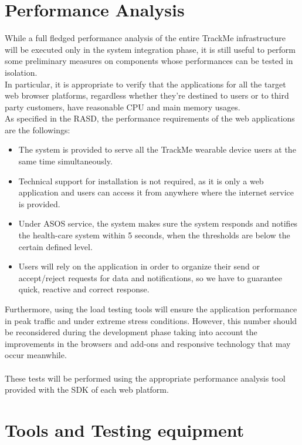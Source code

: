 \documentclass[a4paper, hidelinks, 12pt]{report}
\begin{document}
	
	\chapter{Performance Analysis}
	While a full fledged performance analysis of the entire TrackMe infrastructure will be executed only in the system integration phase, it is still useful to perform some preliminary measures on components whose performances can be tested in isolation.\\
	
	In particular, it is appropriate to verify that the applications for all the target web browser platforms, regardless whether they're destined to users or to third party customers, have reasonable CPU and main memory usages.\\
	
	As specified in the RASD, the performance requirements of the web applications are the followings:
	\begin{itemize}
	\item{} The system is provided to serve all the TrackMe wearable device users at the same time simultaneously.
	\item{} Technical support for installation is not required, as it is only a web application and users can access it from anywhere where the internet service is provided.
	\item{} Under ASOS service, the system makes sure the system responds and notifies the health-care system within 5 seconds, when the thresholds are below the certain defined level.
	\item{} Users will rely on the application in order to organize their send or accept/reject requests for data and notifications, so we have to guarantee quick, reactive and correct response.
	\end{itemize}
	Furthermore, using the load testing tools will ensure the application performance in peak traffic and under extreme stress conditions.
	However, this number should be reconsidered during the development phase taking into account the improvements
in the browsers and add-ons and responsive technology that may occur meanwhile.\\\\
These tests will be performed using the appropriate performance analysis tool provided with the SDK of each web platform.
	
	\chapter{Tools and Testing equipment}
\end{document}
